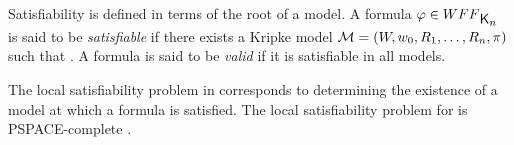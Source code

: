 Satisfiability is defined in terms of the root of a model. A formula $\varphi \in \wff$ is said to be \emph{satisfiable} if there exists a Kripke model $\mathcal{M} = (W, w_0, R_1, \ldots, R_n, \pi)$ such that . A formula is said to be \emph{valid} if it is satisfiable in all models.

The local satisfiability problem in  corresponds to determining the existence of a model at which a formula is satisfied. The local satisfiability problem for  is PSPACE-complete \cite{Spaan:coml}.
